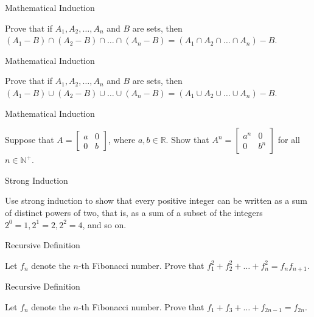 \documentclass{beamer}
\begin{document}
\begin{frame}[t]{Mathematical Induction}
    \begin{example}
        Prove that if $A_1,A_2,\dots,A_n$ and $B$ are sets, then $(A_1-B)\cap(A_2-B)\cap\dots\cap(A_n-B) = (A_1\cap A_2 \cap \dots \cap A_n)-B$. 
    \end{example}
\end{frame}

\begin{frame}[t]{Mathematical Induction}
    \begin{example}
        Prove that if $A_1,A_2,\dots,A_n$ and $B$ are sets, then $(A_1-B)\cup(A_2-B)\cup\dots\cup(A_n-B) = (A_1\cup A_2 \cup \dots \cup A_n)-B$. 
    \end{example}
\end{frame}

\begin{frame}[t]{Mathematical Induction}
    \begin{example}
        Suppose that $A = \begin{bmatrix} a & 0 \\ 0 & b \end{bmatrix}$, where $a, b \in \mathbb{R}$. Show that $A^n = \begin{bmatrix}
            a^n & 0 \\ 0 & b^n
        \end{bmatrix}$ for all $n \in \mathbb{N^+}$. 
    \end{example}
\end{frame}

\begin{frame}[t]{Strong Induction}
    \begin{example}
        Use strong induction to show that every positive integer can be written as a sum of distinct powers of two, that is, as a sum of a subset of the integers $2^0 =1, 2^1 =2, 2^2 = 4$, and so on.
    \end{example}
\end{frame}

\begin{frame}[t]{Recursive Definition}
    \begin{example}
        Let $f_n$ denote the $n$-th Fibonacci number. Prove that $f_1^2 + f_2^2 + \dots + f_n^2 = f_nf_{n+1}$. 
    \end{example}
\end{frame}

\begin{frame}[t]{Recursive Definition}
    \begin{example}
        Let $f_n$ denote the $n$-th Fibonacci number. Prove that $f_1 + f_3 + \dots + f_{2n-1} = f_{2n}$. 
    \end{example}
\end{frame}
\end{document}
